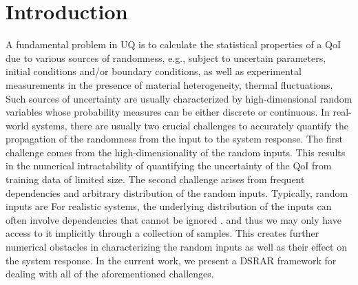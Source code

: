 \section{Introduction}\label{sec:intro}

A fundamental problem in \ac{UQ} \cite{Saltelli_book_2008} is to calculate 
the statistical properties of a \ac{QoI} due to various sources of randomness, e.g.,  subject to uncertain parameters, initial conditions and/or boundary 
conditions, as well as experimental measurements in the presence of material heterogeneity, thermal fluctuations. Such sources of uncertainty 
are usually characterized by high-dimensional random variables whose probability 
measures can be either discrete or continuous. In real-world systems, there are usually two crucial
challenges to accurately quantify the propagation of the randomness from the input to the system response.
The first challenge comes from the high-dimensionality of the random inputs. 
This results in the numerical intractability of quantifying the uncertainty of the \ac{QoI} from training data of limited size. 
%
The second challenge arises from frequent dependencies and arbitrary distribution of the random inputs. 
Typically, random inputs are    
For realistic systems, the underlying distribution of the inputs can often involve dependencies that cannot be 
ignored .
 and thus we may only have access to it implicitly through a 
collection of samples. This creates further numerical obstacles in characterizing the random inputs 
as well as their effect on the system response. In the current work, we present a 
\ac{DSRAR} framework
for dealing with all of the aforementioned challenges. 

